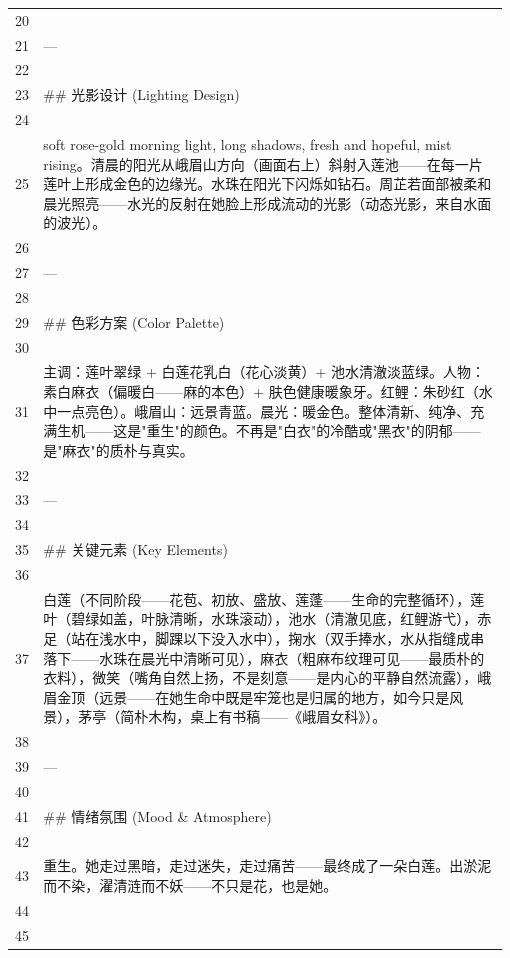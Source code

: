 \begin{longtable}{@{}>{\RaggedLeft\arraybackslash\footnotesize}p{0.04\linewidth}@{\hspace{0.8em}}>{\RaggedRight\arraybackslash\ttfamily\scriptsize}p{0.935\linewidth}@{}}
20 & \mbox{}\\
21 & ---\\
22 & \mbox{}\\
23 & \#\# \promptemoji{💡} 光影设计 (Lighting Design)\\
24 & \mbox{}\\
25 & soft rose-gold morning light, long shadows, fresh and hopeful, mist rising。清晨的阳光从峨眉山方向（画面右上）斜射入莲池——在每一片莲叶上形成金色的边缘光。水珠在阳光下闪烁如钻石。周芷若面部被柔和晨光照亮——水光的反射在她脸上形成流动的光影（动态光影，来自水面的波光）。\\
26 & \mbox{}\\
27 & ---\\
28 & \mbox{}\\
29 & \#\# \promptemoji{🎨} 色彩方案 (Color Palette)\\
30 & \mbox{}\\
31 & 主调：莲叶翠绿 + 白莲花乳白（花心淡黄）+ 池水清澈淡蓝绿。人物：素白麻衣（偏暖白——麻的本色）+ 肤色健康暖象牙。红鲤：朱砂红（水中一点亮色）。峨眉山：远景青蓝。晨光：暖金色。整体清新、纯净、充满生机——这是"重生"的颜色。不再是"白衣"的冷酷或"黑衣"的阴郁——是"麻衣"的质朴与真实。\\
32 & \mbox{}\\
33 & ---\\
34 & \mbox{}\\
35 & \#\# \promptemoji{🔑} 关键元素 (Key Elements)\\
36 & \mbox{}\\
37 & 白莲（不同阶段——花苞、初放、盛放、莲蓬——生命的完整循环），莲叶（碧绿如盖，叶脉清晰，水珠滚动），池水（清澈见底，红鲤游弋），赤足（站在浅水中，脚踝以下没入水中），掬水（双手捧水，水从指缝成串落下——水珠在晨光中清晰可见），麻衣（粗麻布纹理可见——最质朴的衣料），微笑（嘴角自然上扬，不是刻意——是内心的平静自然流露），峨眉金顶（远景——在她生命中既是牢笼也是归属的地方，如今只是风景），茅亭（简朴木构，桌上有书稿——《峨眉女科》）。\\
38 & \mbox{}\\
39 & ---\\
40 & \mbox{}\\
41 & \#\# \promptemoji{😌} 情绪氛围 (Mood \& Atmosphere)\\
42 & \mbox{}\\
43 & 重生。她走过黑暗，走过迷失，走过痛苦——最终成了一朵白莲。出淤泥而不染，濯清涟而不妖——不只是花，也是她。\\
44 & \mbox{}\\
45 & \mbox{}\\

\end{longtable}
